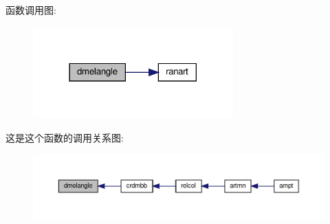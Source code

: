 函数调用图\+:
\nopagebreak
\begin{figure}[H]
\begin{center}
\leavevmode
\includegraphics[width=218pt]{dmelangle_8f90_aa5c23ea4ebf6368de7fef9406f31e7f3_cgraph}
\end{center}
\end{figure}
这是这个函数的调用关系图\+:
\nopagebreak
\begin{figure}[H]
\begin{center}
\leavevmode
\includegraphics[width=350pt]{dmelangle_8f90_aa5c23ea4ebf6368de7fef9406f31e7f3_icgraph}
\end{center}
\end{figure}
